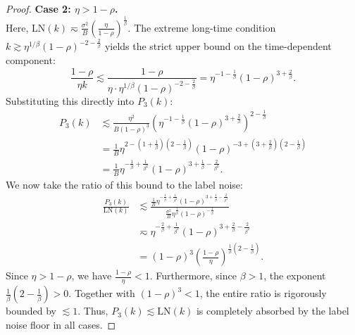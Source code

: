 \begin{proof}
\textbf{Case 2: $\eta > 1-\rho$.} \\
Here, $\text{LN}(k) \eqsim \frac{\sigma^2}{B} \left(\frac{\eta}{1-\rho}\right)^{\frac1\beta}$. The extreme long-time condition $k \gtrsim \eta^{1/\beta}(1-\rho)^{-2-\frac{2}{\beta}}$ yields the strict upper bound on the time-dependent component:
\begin{equation*}
    \frac{1-\rho}{\eta k} \lesssim \frac{1-\rho}{\eta \cdot \eta^{1/\beta}(1-\rho)^{-2-\frac{2}{\beta}}} = \eta^{-1-\frac{1}{\beta}} (1-\rho)^{3+\frac{2}{\beta}}.
\end{equation*}
Substituting this directly into $P_3(k)$:
\begin{align*}
    P_3(k) &\lesssim \frac{\eta^2}{B(1-\rho)^3} \left( \eta^{-1-\frac{1}{\beta}} (1-\rho)^{3+\frac{2}{\beta}} \right)^{2-\frac{1}{\beta}} \\
    &= \frac{1}{B} \eta^{2 - \left(1+\frac{1}{\beta}\right)\left(2-\frac{1}{\beta}\right)} (1-\rho)^{-3 + \left(3+\frac{2}{\beta}\right)\left(2-\frac{1}{\beta}\right)} \\
    &= \frac{1}{B} \eta^{-\frac{1}{\beta} + \frac{1}{\beta^2}} (1-\rho)^{3 + \frac{1}{\beta} - \frac{2}{\beta^2}}.
\end{align*}
We now take the ratio of this bound to the label noise:
\begin{align*}
    \frac{P_3(k)}{\text{LN}(k)} &\lesssim \frac{\frac{1}{B} \eta^{-\frac{1}{\beta} + \frac{1}{\beta^2}} (1-\rho)^{3 + \frac{1}{\beta} - \frac{2}{\beta^2}}}{\frac{\sigma^2}{B} \eta^{\frac{1}{\beta}} (1-\rho)^{-\frac{1}{\beta}}} \\
    &\eqsim \eta^{-\frac{2}{\beta} + \frac{1}{\beta^2}} (1-\rho)^{3 + \frac{2}{\beta} - \frac{2}{\beta^2}} \\
    &= (1-\rho)^3 \left( \frac{1-\rho}{\eta} \right)^{\frac{1}{\beta}\left(2-\frac{1}{\beta}\right)}.
\end{align*}
Since $\eta > 1-\rho$, we have $\frac{1-\rho}{\eta} < 1$. Furthermore, since $\beta > 1$, the exponent $\frac{1}{\beta}\left(2-\frac{1}{\beta}\right) > 0$. Together with $(1-\rho)^3 < 1$, the entire ratio is rigorously bounded by $\lesssim 1$. Thus, $P_3(k) \lesssim \text{LN}(k)$ is completely absorbed by the label noise floor in all cases.


\end{proof}
